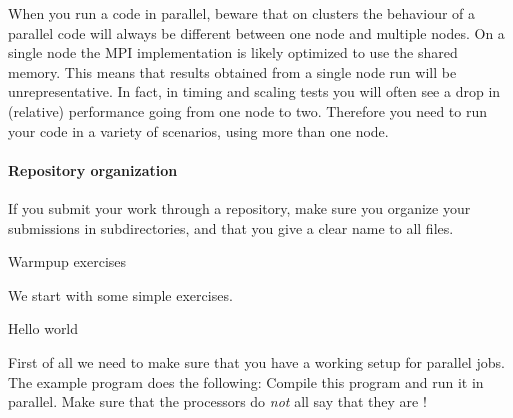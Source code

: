 When you run a code in parallel, beware that on clusters the behaviour
of a parallel code will always be different between one node and
multiple nodes.  On a single node the MPI implementation is likely
optimized to use the shared memory. This means that results obtained
from a single node run will be unrepresentative. In fact, in timing
and scaling tests you will often see a drop in (relative) performance
going from one node to two.  Therefore you need to run your code in a
variety of scenarios, using more than one node.

\paragraph*{Repository organization}

If you submit your work through a repository, make sure you organize your submissions in subdirectories,
and that you give a clear name to all files.

 {Warmpup exercises}

We start with some simple exercises.

 {Hello world}

First of all we need to make sure that you have a working setup for
parallel jobs. The example program  does the
following:
Compile this program and run it in parallel. Make sure that the processors
do \emph{not} all say that they are !

